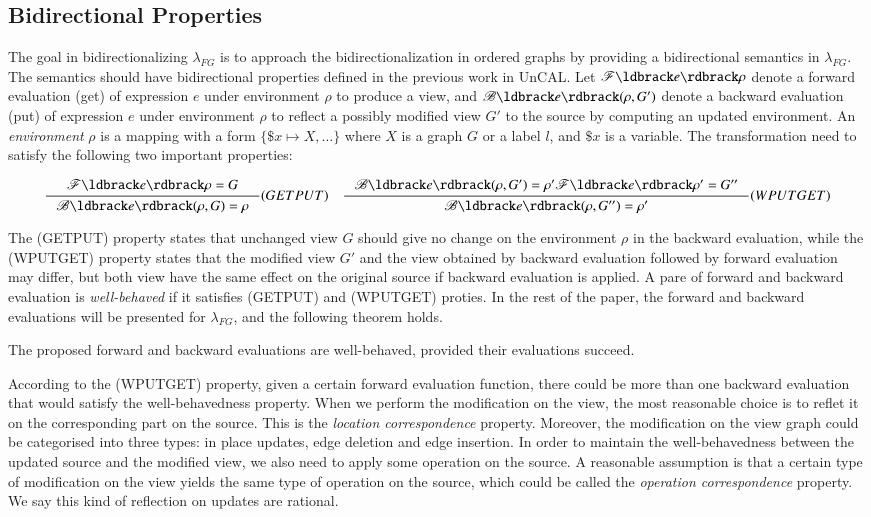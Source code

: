 \documentclass{llncs}
\begin{document}
\subsection{Bidirectional Properties}\label{subsec:b-prop}

The goal in bidirectionalizing $\lambda_{FG}$ is to approach the bidirectionalization in ordered graphs by providing a bidirectional semantics in $\lambda_{FG}$. The semantics should have bidirectional properties defined in the previous work in UnCAL. Let $\mathscr{F}\ldbrack e\rdbrack\rho$ denote a forward evaluation (get) of expression $e$ under environment $\rho$ to produce a view, and $\mathscr{B}\ldbrack e\rdbrack(\rho,G')$ denote a backward evaluation (put) of expression $e$ under environment $\rho$ to reflect a possibly modified view $G'$ to the source by computing an updated environment. An \emph{environment} $\rho$ is a mapping with a form $\{\$x\mapsto X,\ldots\}$ where $X$ is a graph $G$ or a label $l$, and $\$x$ is a variable. The transformation need to satisfy the following two important properties:

$$\inference{\mathscr{F}\ldbrack e\rdbrack\rho=G}{\mathscr{B}\ldbrack e\rdbrack(\rho,G)=\rho}(GETPUT)\quad
\inference{\mathscr{B}\ldbrack e\rdbrack(\rho,G')=\rho' \mathscr{F}\ldbrack e\rdbrack\rho'=G''}{\mathscr{B}\ldbrack e\rdbrack(\rho,G'')=\rho'}(WPUTGET)$$

The (GETPUT) property states that unchanged view $G$ should give no change on the environment $\rho$ in the backward evaluation, while the (WPUTGET) property states that the modified view $G'$ and the view obtained by backward evaluation followed by forward evaluation may differ, but both view have the same effect on the original source if backward evaluation is applied. A pare of forward and backward evaluation is \emph{well-behaved} if it satisfies (GETPUT) and (WPUTGET) proties. In the rest of the paper, the forward and backward evaluations will be presented for $\lambda_{FG}$, and the following theorem holds.

\begin{theorem}\label{th:wellb}
The proposed forward and backward evaluations are well-behaved, provided their evaluations succeed.
\end{theorem}

According to the (WPUTGET) property, given a certain forward evaluation function, there could be more than one backward evaluation that would satisfy the well-behavedness property. When we perform the modification on the view, the most reasonable choice is to reflet it on the corresponding part on the source. This is the \emph{location correspondence} property. Moreover, the modification on the view graph could be categorised into three types: in place updates, edge deletion and edge insertion. In order to maintain the well-behavedness between the updated source and the modified view, we also need to apply some operation on the source. A reasonable assumption is that a certain type of modification on the view yields the same type of operation on the source, which could be called the \emph{operation correspondence} property. We say this kind of reflection on updates are rational.
\end{document}
